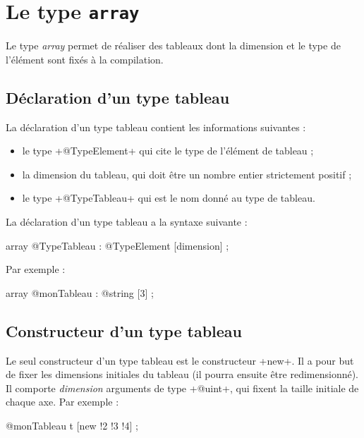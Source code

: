 
\chapter{Le type \texttt{array}}

Le type \emph{array} permet de réaliser des tableaux dont la dimension et le type de l'élément sont fixés à la compilation.

\section{Déclaration d'un type tableau}

La déclaration d'un type tableau contient les informations suivantes :
\begin{itemize}
  \item le type \ggs+@TypeElement+ qui cite le type de l'élément de tableau ;
  \item la dimension du tableau, qui doit être un nombre entier strictement positif ;
  \item le type \ggs+@TypeTableau+ qui est le nom donné au type de tableau.
\end{itemize}

La déclaration d'un type tableau a la syntaxe suivante :
\begin{galgascode}
array @TypeTableau : @TypeElement [dimension] ;
\end{galgascode}

Par exemple :
\begin{galgascode}
array @monTableau : @string [3] ;
\end{galgascode}


\section{Constructeur d'un type tableau}

Le seul constructeur d'un type tableau est le constructeur \ggs+new+. Il a pour but de fixer les dimensions initiales du tableau (il pourra ensuite être redimensionné). Il comporte \emph{dimension} arguments de type \ggs+@uint+, qui fixent la taille initiale de chaque axe.
Par exemple :
\begin{galgascode}
  @monTableau t [new !2 !3 !4] ;
\end{galgascode}

